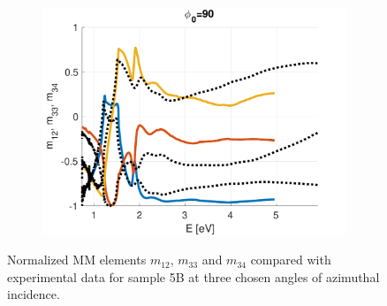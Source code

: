 \begin{figure}[h!]
\begin{subfigure}{0.32\linewidth}
        \includegraphics[width=\linewidth, trim= 0cm 0cm 2cm 0cm, clip]{figures/ch4/S5B/NCS/S5B_NCS_phi90.pdf}
   \end{subfigure}
   \caption{Normalized MM elements $m_{12}$, $m_{33}$ and $m_{34}$ compared with experimental data for sample 5B at three chosen angles of azimuthal incidence.}
   \label{fig:S5B_NCS}
\end{figure}




